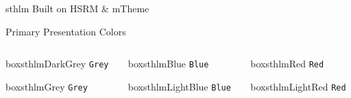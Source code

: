 \documentclass[newPxFont]{beamer}
\begin{document}
\begin{frame}[c]{sthlm Built on HSRM \& mTheme}
\begin{frame}[c]{Primary Presentation Colors}
\begin{columns}[c]

\begin{column}{0.12\textwidth}
\vspace{3em}
\begin{beamercolorbox}[wd=\linewidth,ht=5ex,dp=3ex]{boxsthlmDarkGrey}
\centering
	\texttt{Grey}
\end{beamercolorbox}

\vspace{3em}

\begin{beamercolorbox}[wd=\linewidth,ht=5ex,dp=3ex]{boxsthlmGrey}
\centering
	\texttt{Grey}
\end{beamercolorbox}

\end{column}

\begin{column}{0.12\textwidth}

\vspace{3em}
	
\begin{beamercolorbox}[wd=\linewidth,ht=5ex,dp=3ex]{boxsthlmBlue}
\centering
	\texttt{Blue}
\end{beamercolorbox}

\vspace{3em}

\begin{beamercolorbox}[wd=\linewidth,ht=5ex,dp=3ex]{boxsthlmLightBlue}
\centering
	\texttt{Blue}
\end{beamercolorbox}
\end{column}

\begin{column}{0.12\textwidth}

\vspace{3em}
\begin{beamercolorbox}[wd=\linewidth,ht=5ex,dp=3ex]{boxsthlmRed}
\centering
	\texttt{Red}
\end{beamercolorbox}

\vspace{3em}

\begin{beamercolorbox}[wd=\linewidth,ht=5ex,dp=3ex]{boxsthlmLightRed}
\centering
	\texttt{Red}
\end{beamercolorbox}
\end{column}


\end{columns}
\end{frame}
\end{frame}
\end{document}
